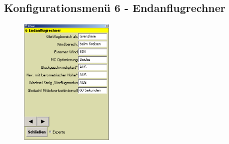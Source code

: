 \subsection{Konfigurationsmenü 6 - Endanflugrechner}\label{Konfig6}
\begin{figure}
\includegraphics[width=4.5cm]{Bilder/Konfig6Endanflugrechner.png}
\end{figure}

